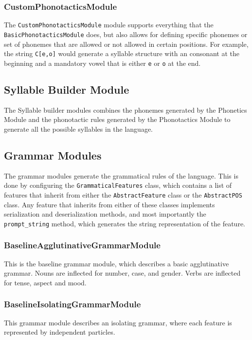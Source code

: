 \subsubsection{CustomPhonotacticsModule}
The \texttt{CustomPhonotacticsModule} module supports everything that the \texttt{BasicPhonotacticsModule} does, but also allows for defining
specific phonemes or set of phonemes that are allowed or not allowed in certain positions. For example, the string \texttt{C[e,o]} would generate a syllable 
structure with an consonant at the beginning and a mandatory vowel that is either \texttt{e} or \texttt{o} at the end.

\subsection{Syllable Builder Module}
The Syllable builder modules combines the phonemes generated by the Phonetics Module and the phonotactic rules generated by the Phonotactics Module to
generate all the possible syllables in the language.

\subsection{Grammar Modules}
The grammar modules generate the grammatical rules of the language. This is done by configuring the \texttt{GrammaticalFeatures} class, which contains a list of features
that inherit from either the \texttt{AbstractFeature} class or the \texttt{AbstractPOS} class. Any feature that inherits from either of these classes implements serialization and deserialization methods, 
and most importantly the \texttt{prompt\_string} method, which generates the string representation of the feature.

\subsubsection{BaselineAgglutinativeGrammarModule}
This is the baseline grammar module, which describes a basic agglutinative grammar. Nouns are inflected for number, case, and gender. Verbs are inflected for tense, aspect and mood.

\subsubsection{BaselineIsolatingGrammarModule}
This grammar module describes an isolating grammar, where each feature is represented by independent particles.



